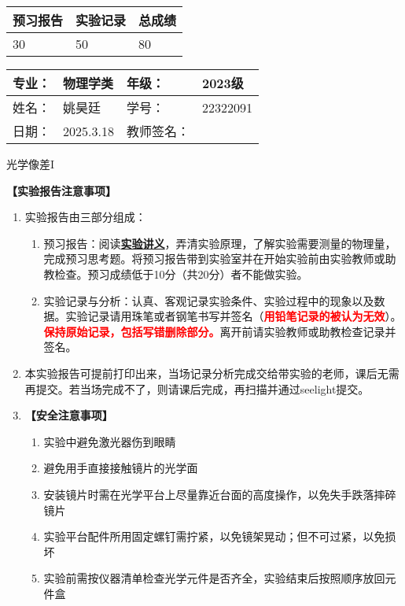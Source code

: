 \documentclass[dvipsnames, svgnames,a4paper,11pt]{article}
\newcommand{\exname}{光学像差I}%
\begin{document}
\begin{table}
	\renewcommand\arraystretch{1.7}
	\begin{tabularx}{\textwidth}{
		|X|X|X|X
		|X|X|}
	\hline
	\multicolumn{2}{|c|}{预习报告}&\multicolumn{2}{|c|}{实验记录}&\multicolumn{2}{|c|}{总成绩}\\
	\hline
	 \hspace{0.625cm}30& & \hspace{0.625cm}50  & &  \hspace{0.625cm}80 & \\
	\hline
	\end{tabularx}
\end{table}


\begin{table}
	\renewcommand\arraystretch{1.7}
	\begin{tabularx}{\textwidth}{|X|X|X|X|}
	\hline
	专业：& 物理学类 &年级：&2023级 \\
	\hline
	姓名：& 姚昊廷  & 学号：&22322091\\
	\hline
	日期：&2025.3.18& 教师签名：& \\
	\hline
	\end{tabularx}
\end{table}

\begin{center}
	\LARGE \exname
\end{center}

\textbf{【实验报告注意事项】}
\begin{enumerate}
	\item 实验报告由三部分组成：
	\begin{enumerate}
		\item 预习报告：阅读\underline{\textbf{实验讲义}}，弄清实验原理，了解实验需要测量的物理量，完成预习思考题。将预习报告带到实验室并在开始实验前由实验教师或助教检查。预习成绩低于10分（共20分）者不能做实验。
	    \item 实验记录与分析：认真、客观记录实验条件、实验过程中的现象以及数据。实验记录请用珠笔或者钢笔书写并签名（\textcolor{red}{\textbf{用铅笔记录的被认为无效}}）。\textcolor{red}{\textbf{保持原始记录，包括写错删除部分。}}离开前请实验教师或助教检查记录并签名。
	\end{enumerate}
	\item 本实验报告可提前打印出来，当场记录分析完成交给带实验的老师，课后无需再提交。若当场完成不了，则请课后完成，再扫描并通过seelight提交。
	\item \textbf{【安全注意事项】}
    \begin{enumerate}
        \item 实验中避免激光器伤到眼睛
        \item 避免用手直接接触镜片的光学面
        \item 安装镜片时需在光学平台上尽量靠近台面的高度操作，以免失手跌落摔碎镜片
        \item 实验平台配件所用固定螺钉需拧紧，以免镜架晃动；但不可过紧，以免损坏
        \item 实验前需按仪器清单检查光学元件是否齐全，实验结束后按照顺序放回元件盒
    \end{enumerate}
\end{enumerate}
\end{document}
